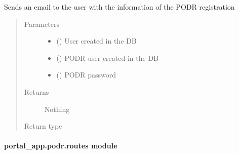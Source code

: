 \documentclass[letterpaper,10pt,english]{sphinxmanual}
\begin{document}
\begin{fulllineitems}
\label{\detokenize{CE_app.podr:CE_app.podr.email.send_podr_confirm_register}}
\sphinxAtStartPar
Sends an email to the user with the information of the PODR registration
\begin{quote}\begin{description}
\item[{Parameters}] \leavevmode\begin{itemize}
\item {} 
\sphinxAtStartPar
{} ({\hyperref[\detokenize{CE_app:CE_app.models.User}]{}}) \textendash{} User created in the DB

\item {} 
\sphinxAtStartPar
{} () \textendash{} PODR user created in the DB

\item {} 
\sphinxAtStartPar
{} () \textendash{} PODR password

\end{itemize}

\item[{Returns}] \leavevmode
\sphinxAtStartPar
Nothing

\item[{Return type}] \leavevmode
\sphinxAtStartPar


\end{description}\end{quote}

\end{fulllineitems}



\paragraph{portal\_app.podr.routes module}
\label{\detokenize{CE_app.podr:module-CE_app.podr.routes}}\label{\detokenize{CE_app.podr:portal-app-podr-routes-module}}
\end{document}
